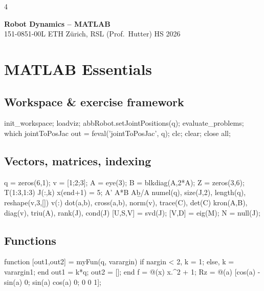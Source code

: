 \documentclass[8pt,landscape]{extarticle}
\begin{document}
\scriptsize
\begin{multicols*}{4}

\begin{tcolorbox}[colback=ethblue,colframe=ethblue,coltext=white,arc=0pt,left=2pt,right=2pt,top=1pt,bottom=1pt]
{\bfseries\normalsize Robot Dynamics -- MATLAB}\\
{\tiny 151-0851-00L \textbullet{} ETH Zürich, RSL (Prof.\ Hutter) \textbullet{} HS 2026}
\end{tcolorbox}

\section{MATLAB Essentials}
\subsection{Workspace \& exercise framework}
\begin{ml}
init_workspace;          %
loadviz;                 %
abbRobot.setJointPositions(q);   %
evaluate_problems;       %
which jointToPosJac      %
out = feval('jointToPosJac', q);  %
clc; clear; close all;   %
\end{ml}
\subsection{Vectors, matrices, indexing}
\begin{ml}
q = zeros(6,1); v = [1;2;3];  %
A = eye(3); B = blkdiag(A,2*A); Z = zeros(3,6);
T(1:3,1:3)   %
J(:,k)       %
x(end+1) = 5;             %
A'  %
A*B %
A\b %
b/A %
numel(q), size(J,2), length(q), reshape(v,3,[])
v(:)          %
dot(a,b), cross(a,b), norm(v), trace(C), det(C)
kron(A,B), diag(v), triu(A), rank(J), cond(J)
[U,S,V] = svd(J); [V,D] = eig(M); N = null(J);
\end{ml}
\subsection{Functions}
\begin{ml}
function [out1,out2] = myFun(q, varargin)
  if nargin < 2, k = 1; else, k = varargin{1}; end
  out1 = k*q; out2 = [];
end
f   = @(x) x.^2 + 1;          %
Rz  = @(a) [cos(a) -sin(a) 0; sin(a) cos(a) 0; 0 0 1];
\end{ml}

\end{multicols*}
\end{document}
